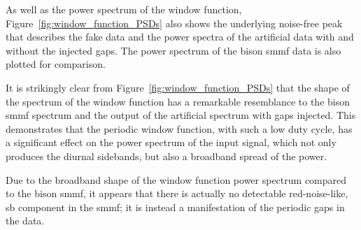 

As well as the power spectrum of the window function, Figure~\ref{fig:window_function_PSDs} also shows the underlying noise-free peak that describes the fake data and the power spectra of the artificial data with and without the injected gaps. The power spectrum of the \gls{bison} \gls{smmf} data is also plotted for comparison.

It is strikingly clear from Figure~\ref{fig:window_function_PSDs} that the shape of the spectrum of the window function has a remarkable resemblance to the \gls{bison} \gls{smmf} spectrum and the output of the artificial spectrum with gaps injected. This demonstrates that the periodic window function, with such a low duty cycle, has a significant effect on the power spectrum of the input signal, which not only produces the diurnal sidebands, but also a broadband spread of the power.

Due to the broadband shape of the window function power spectrum compared to the \gls{bison} \gls{smmf}, it appears that there is actually no detectable red-noise-like, \gls{sb} component in the \gls{smmf}; it is instead a manifestation of the periodic gaps in the data. %

